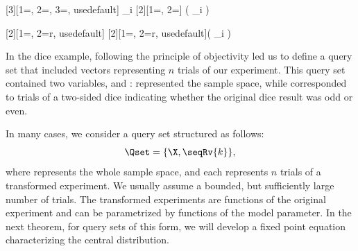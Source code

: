 \newcommand{\ratio}[1]{\frac{\avgPost[{#1}][\cMass{}]}{\cMass{#1}}}
[3][1=\w, 2=\w, 3=\cMass{}, usedefault]{
    \prod_i 
}
[2][1={\avgPost[][\cMass{}]}, 2=\cMass{}]{
    \left( \prod_i  \right)
}
\newcommand{\fixedPoint}{\normConst \solPrior}
\newcommand{\fpMap}[1]{T \ifthenelse{\isempty{#1}}{}{\left[\,#1\,\right]}}
\newcommand{\normConst}{\mu}
\newcommand{\solPrior}{r}
\newcommand{\solDist}{R}

[2][1={\w[i]}, 2=\solPrior, usedefault]{
}
[2][1=\w, 2=\solPrior, usedefault]{\left( \leg[{#1}][{#2}] \prod_i \leg[{\w[i]}][{#2}] \right)}
\newcommand{\unnorm}{\rho}

In the dice example, following the principle of objectivity led us to define a query set that included vectors
representing $n$ trials of our experiment.
This query set contained two variables, \X and \Y: \X represented the sample space,
while \Y corresponded to trials of a two-sided dice indicating whether the original dice result was odd or even.

In many cases, we consider a query set structured as follows:
\[
    \Qset = \{\X, \seqRv{k}\},
\] where \X represents the whole sample space, and each \X[i] represents $n$ trials of a transformed experiment.
We usually assume a bounded, but sufficiently large number of trials.
The transformed experiments are functions of the original experiment and can be parametrized by functions of the
model parameter.
In the next theorem, for query sets of this form, we will develop a fixed point equation characterizing the
central distribution.



